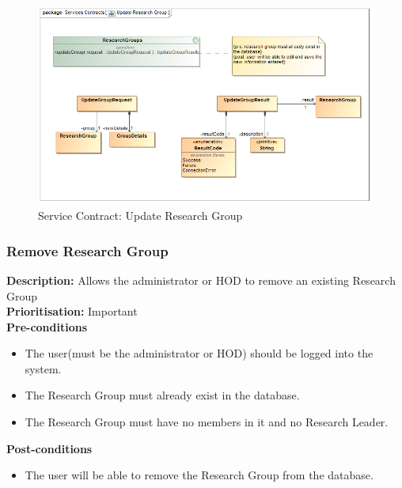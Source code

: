 \documentclass[a4paper]{article}
\begin{document}
    	    	\begin{figure}[H]
    	    		\centering
    	    		\includegraphics[width=\textwidth]{../Assignment1/5.1.13.Update.Research.Group.Services.Contract.png}
    	    		\caption{Service Contract: Update Research Group}
    	    	\end{figure}
    	
    	\pagebreak
    \subsubsection{Remove Research Group}
    	\textbf{Description:} Allows the administrator or HOD to remove an existing Research Group\\
    	\textbf{Prioritisation:} Important\\
    	
    	\textbf{Pre-conditions}
    	 \begin{itemize}
    		\item The user(must be the administrator or HOD) should be logged into the system.
    		\item The Research Group must already exist in the database.
    		\item The Research Group must have no members in it and no Research Leader.
    	\end{itemize}
    	
    	\textbf{Post-conditions}
    	 \begin{itemize}
    		\item The user will be able to remove the Research Group from the database.
    	\end{itemize}
    	
\end{document}
